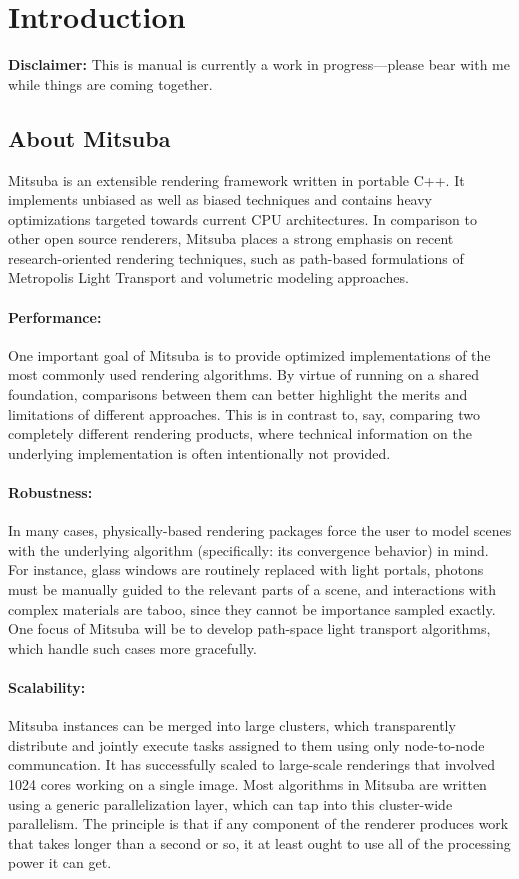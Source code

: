 \section{Introduction}
\textbf{Disclaimer:} This is manual is currently a work in progress---please
bear with me while things are coming together.

\subsection{About Mitsuba}
Mitsuba is an extensible rendering framework written in portable C++. It implements unbiased 
as well as biased techniques and contains heavy optimizations targeted towards current CPU 
architectures.
In comparison to other open source renderers, Mitsuba places a strong emphasis on recent research-oriented 
rendering techniques, such as path-based formulations of Metropolis Light Transport and volumetric
modeling approaches.

\paragraph{Performance:}
One important goal of Mitsuba is to provide optimized implementations of the most commonly 
used rendering algorithms. By virtue of running on a shared foundation, comparisons between them can
better highlight the merits and limitations of different approaches. This is in contrast to, say, 
comparing two completely different rendering products, where technical information on the underlying 
implementation is often intentionally not provided.

\paragraph{Robustness:}
In many cases, physically-based rendering packages force the user to model scenes with the underlying 
algorithm (specifically: its convergence behavior) in mind. For instance, glass windows are routinely 
replaced with light portals, photons must be manually guided to the relevant parts of a scene, and 
interactions with complex materials are taboo, since they cannot be importance sampled exactly. 
One focus of Mitsuba will be to develop path-space light transport algorithms, which handle such 
cases more gracefully.

\paragraph{Scalability:} Mitsuba instances can be merged into large clusters, which transparently distribute and 
jointly execute tasks assigned to them using only node-to-node communcation. It has successfully
scaled to large-scale renderings that involved 1024 cores working on a single image.
Most algorithms in Mitsuba  are written using a generic parallelization layer, which can tap 
into this cluster-wide parallelism. The principle is that if any component of the renderer produces
work that takes longer than a second or so, it at least ought to use all of the processing power 
it can get.

